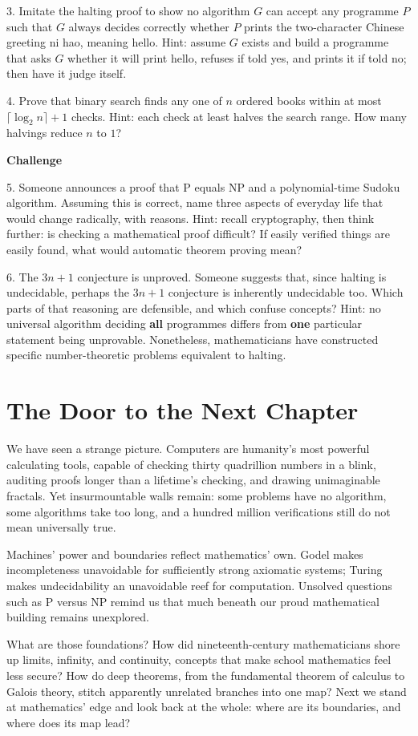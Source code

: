 3. Imitate the halting proof to show no algorithm $G$ can accept any programme $P$ such that $G$ always decides correctly whether $P$ prints the two-character Chinese greeting ni hao, meaning hello. Hint: assume $G$ exists and build a programme that asks $G$ whether it will print hello, refuses if told yes, and prints it if told no; then have it judge itself.

4. Prove that binary search finds any one of $n$ ordered books within at most $\lceil \log_2 n \rceil + 1$ checks. Hint: each check at least halves the search range. How many halvings reduce $n$ to $1$?

\textbf{Challenge}

5. Someone announces a proof that P equals NP and a polynomial-time Sudoku algorithm. Assuming this is correct, name three aspects of everyday life that would change radically, with reasons. Hint: recall cryptography, then think further: is checking a mathematical proof difficult? If easily verified things are easily found, what would automatic theorem proving mean?

6. The $3n+1$ conjecture is unproved. Someone suggests that, since halting is undecidable, perhaps the $3n+1$ conjecture is inherently undecidable too. Which parts of that reasoning are defensible, and which confuse concepts? Hint: no universal algorithm deciding \textbf{all} programmes differs from \textbf{one} particular statement being unprovable. Nonetheless, mathematicians have constructed specific number-theoretic problems equivalent to halting.

\section*{The Door to the Next Chapter}

We have seen a strange picture. Computers are humanity's most powerful calculating tools, capable of checking thirty quadrillion numbers in a blink, auditing proofs longer than a lifetime's checking, and drawing unimaginable fractals. Yet insurmountable walls remain: some problems have no algorithm, some algorithms take too long, and a hundred million verifications still do not mean universally true.

Machines' power and boundaries reflect mathematics' own. Godel makes incompleteness unavoidable for sufficiently strong axiomatic systems; Turing makes undecidability an unavoidable reef for computation. Unsolved questions such as P versus NP remind us that much beneath our proud mathematical building remains unexplored.

What are those foundations? How did nineteenth-century mathematicians shore up limits, infinity, and continuity, concepts that make school mathematics feel less secure? How do deep theorems, from the fundamental theorem of calculus to Galois theory, stitch apparently unrelated branches into one map? Next we stand at mathematics' edge and look back at the whole: where are its boundaries, and where does its map lead?

